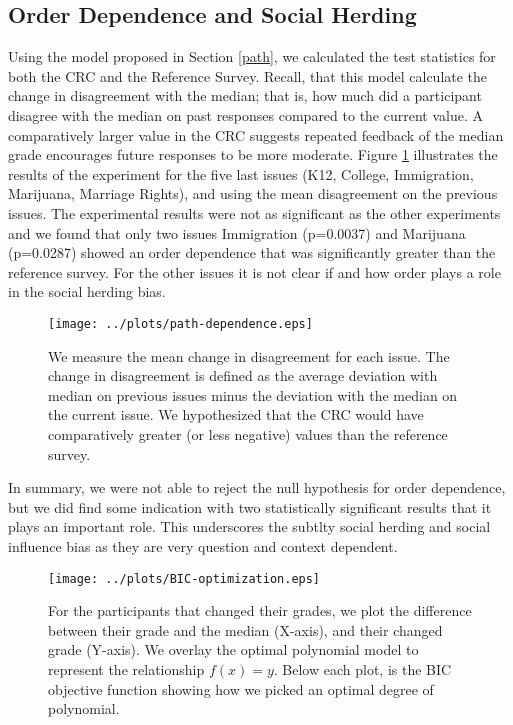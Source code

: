 \subsection{Order Dependence and Social Herding}
Using the model proposed in Section \ref{path}, we calculated the test statistics for both the CRC and the Reference Survey.
Recall, that this model calculate the change in disagreement with the median; that is, how much did a participant disagree with the median on past responses compared 
to the current value.
A comparatively larger value in the CRC suggests repeated feedback of the median grade encourages future responses to be more moderate.
Figure \ref{path-1} illustrates the results of the experiment for the five last issues (K12, College, Immigration, Marijuana, Marriage Rights), and using the mean disagreement on the previous issues.
The experimental results were not as significant as the other experiments and we found that only two issues Immigration (p=0.0037) and Marijuana (p=0.0287) showed an order dependence that was significantly greater than the reference survey.
For the other issues it is not clear if and how order plays a role in the social herding bias.
\begin{figure}[h]
	\hspace{-2em}
    \texttt{[image: ../plots/path-dependence.eps]}
      \caption{We measure the mean change in disagreement for each issue. The change in disagreement is defined as the average deviation with median on previous issues minus the deviation with the median on the current issue. We hypothesized that the CRC would have comparatively greater (or less negative) values than the reference survey.}
      \label{path-1}
\end{figure}
In summary, we were not able to reject the null hypothesis for order dependence, but we did find some indication with two statistically significant results that it plays an important role.
This underscores the subtlty social herding and social influence bias as they are very question and context dependent.

\begin{figure*}[ht!]
\hspace{-7em}
    \texttt{[image: ../plots/BIC-optimization.eps]}
      \caption{For the participants that changed their grades, we plot the difference between their grade and the median (X-axis), and their changed grade (Y-axis). We overlay the optimal polynomial model to represent the relationship $f(x) = y$. Below each plot, is the BIC objective function showing how we picked an optimal degree of polynomial.}
      \label{opt-1}
\end{figure*}
